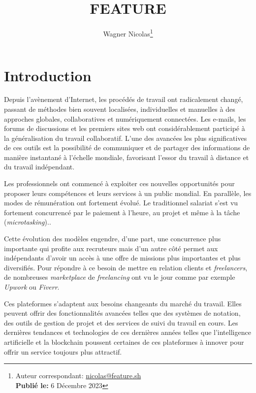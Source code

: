 \documentclass[
	a4paper, %
	10pt, %
	unnumberedsections, %
	twoside, %
]{LTJournalArticle}
\title{FEATURE} %
\author{%
	Wagner Nicolas\thanks{Auteur correspondant: \href{mailto:nicolas@feature.sh}{nicolas@feature.sh}\\ \textbf{Publié le:} 6 Décembre 2023}
}
\begin{document}
\maketitle %


\section{Introduction}

Depuis l'avènement d'Internet, les procédés de travail ont radicalement changé, passant de méthodes bien souvent localisées, individuelles et manuelles à des approches globales, collaboratives et numériquement connectées. Les e-mails, les forums de discussions et les premiers sites web ont considérablement participé à
la généralisation du travail collaboratif. L'une des avancées les plus significatives de ces outils est la possibilité de communiquer et de partager des informations de manière instantané à l'échelle mondiale, favorisant l'essor du travail à distance et du travail indépendant.

Les professionnels ont commencé à exploiter ces nouvelles opportunités pour proposer leurs compétences et leurs services à un public mondial. En parallèle, les modes de rémunération ont fortement évolué. Le traditionnel salariat s'est vu fortement concurrencé par le
paiement à l'heure, au projet et même à la tâche (\emph{microtasking})..

Cette évolution des modèles engendre, d'une part, une concurrence plus importante qui profite aux recruteurs mais d'un autre côté permet aux indépendants d'avoir un accès à une offre de missions plus importantes et plus diversifiés. Pour répondre à ce besoin de mettre en relation clients et \emph{freelancers}, de nombreuses \emph{marketplace} de \emph{freelancing} ont vu le jour comme par exemple \emph{Upwork} ou \emph{Fiverr}.

Ces plateformes s'adaptent aux besoins changeants du marché du travail. Elles peuvent offrir des fonctionnalités avancées telles que des systèmes de notation, des outils de gestion de projet et des services de suivi du travail en cours. Les dernières tendances et technologies de ces dernières années telles que l'intelligence artificielle et la blockchain poussent certaines de ces plateformes à innover pour offrir un service toujours plus attractif.
\end{document}
